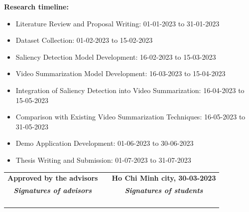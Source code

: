 \documentclass[14pt]{extarticle}
\begin{document}
    \vspace{.5cm}
    \textbf{\large Research timeline:} \\
    \begin{itemize}
        \item Literature Review and Proposal Writing: 01-01-2023 to 31-01-2023
        \item Dataset Collection: 01-02-2023 to 15-02-2023
        \item Saliency Detection Model Development: 16-02-2023 to 15-03-2023
        \item Video Summarization Model Development: 16-03-2023 to 15-04-2023
        \item Integration of Saliency Detection into Video Summarization: 16-04-2023 to 15-05-2023
        \item Comparison with Existing Video Summarization Techniques: 16-05-2023 to 31-05-2023
        \item Demo Application Development: 01-06-2023 to 30-06-2023
        \item Thesis Writing and Submission: 01-07-2023 to 31-07-2023
    \end{itemize}
    
    \vspace{1cm}
    \begin{table}[h]
        \begin{tabular}{p{} p{} p{}}
        \multicolumn{1}{c}{\textbf{Approved by the advisors}} & & \multicolumn{1}{c}{\textbf{Ho Chi Minh city, 30-03-2023}}       \\
        \multicolumn{1}{c}{\textit{\textbf{Signatures of advisors}}} & & \multicolumn{1}{c}{\textit{\textbf{Signatures of students}}} \\
        \multicolumn{1}{c}{} & & \multicolumn{1}{c}{}\\
        \multicolumn{1}{c}{} & & \multicolumn{1}{c}{}\\
        \multicolumn{1}{c}{} & & \multicolumn{1}{c}{}\\
        \multicolumn{1}{c}{} & & \multicolumn{1}{c}{}\\
        \end{tabular}
    \end{table}
\end{document}
